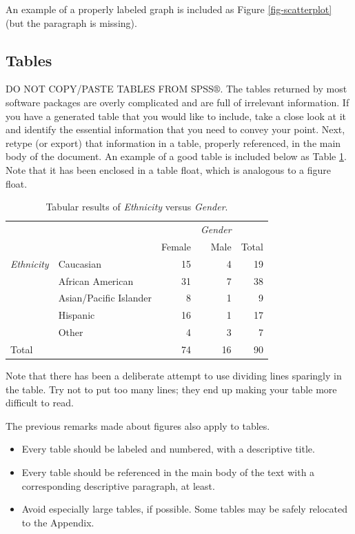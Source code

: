 \documentclass[11pt]{article}
\begin{document}
An example of a properly labeled graph is included as Figure \ref{fig-scatterplot} (but the paragraph is missing).
\subsection[Tables]{Tables}
\label{sec-4-2}

DO NOT COPY/PASTE TABLES FROM SPSS\(\circledR\). The tables returned
by most software packages are overly complicated and are full of
irrelevant information. If you have a generated table that you would
like to include, take a close look at it and identify the essential
information that you need to convey your point. Next, retype (or
export) that information in a table, properly referenced, in the main
body of the document. An example of a good table is included below as
Table \ref{tab-gender}.  Note that it has been enclosed in a table float,
which is analogous to a figure float.

\begin{table}[htb]
\caption{\label{tab-gender}\small Tabular results of \emph{Ethnicity} versus \emph{Gender}.}
\centering
\begin{tabular}{llrrr}
 &  &  & \emph{Gender} & \\
 &  & Female & Male & Total\\
\hline
\emph{Ethnicity} & Caucasian & 15 & 4 & 19\\
 & African American & 31 & 7 & 38\\
 & Asian/Pacific Islander & 8 & 1 & 9\\
 & Hispanic & 16 & 1 & 17\\
 & Other & 4 & 3 & 7\\
\hline
Total &  & 74 & 16 & 90\\
\end{tabular}
\end{table}

Note that there has been a deliberate attempt to use dividing lines
sparingly in the table. Try not to put too many lines; they end up
making your table more difficult to read.

The previous remarks made about figures also apply to tables.
\begin{itemize}
\item Every table should be labeled and numbered, with a descriptive
title.
\item Every table should be referenced in the main body of the text with a
corresponding descriptive paragraph, at least.
\item Avoid especially large tables, if possible. Some tables may be
safely relocated to the Appendix.
\end{itemize}
\end{document}
